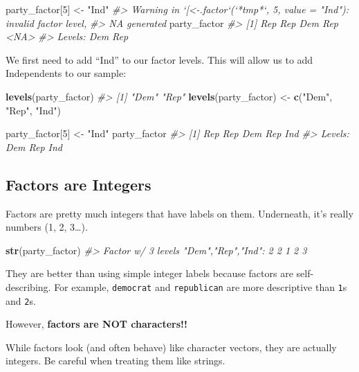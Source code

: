 \documentclass[]{book}
\newenvironment{Shaded}{\begin{snugshade}}{\end{snugshade}}
\newcommand{\KeywordTok}[1]{\textcolor[rgb]{0.13,0.29,0.53}{\textbf{#1}}}
\newcommand{\DecValTok}[1]{\textcolor[rgb]{0.00,0.00,0.81}{#1}}
\newcommand{\StringTok}[1]{\textcolor[rgb]{0.31,0.60,0.02}{#1}}
\newcommand{\CommentTok}[1]{\textcolor[rgb]{0.56,0.35,0.01}{\textit{#1}}}
\newcommand{\NormalTok}[1]{#1}
\begin{document}
\begin{Shaded}
\begin{Highlighting}[]
\NormalTok{party_factor[}\DecValTok{5}\NormalTok{] <-}\StringTok{ "Ind"}
\CommentTok{#> Warning in `[<-.factor`(`*tmp*`, 5, value = "Ind"): invalid factor level,}
\CommentTok{#> NA generated}
\NormalTok{party_factor}
\CommentTok{#> [1] Rep  Rep  Dem  Rep  <NA>}
\CommentTok{#> Levels: Dem Rep}
\end{Highlighting}
\end{Shaded}

We first need to add ``Ind'' to our factor levels. This will allow us to
add Independents to our sample:

\begin{Shaded}
\begin{Highlighting}[]
\KeywordTok{levels}\NormalTok{(party_factor)}
\CommentTok{#> [1] "Dem" "Rep"}
\KeywordTok{levels}\NormalTok{(party_factor) <-}\StringTok{ }\KeywordTok{c}\NormalTok{(}\StringTok{"Dem"}\NormalTok{, }\StringTok{"Rep"}\NormalTok{, }\StringTok{"Ind"}\NormalTok{)}

\NormalTok{party_factor[}\DecValTok{5}\NormalTok{] <-}\StringTok{ "Ind"}
\NormalTok{party_factor}
\CommentTok{#> [1] Rep Rep Dem Rep Ind}
\CommentTok{#> Levels: Dem Rep Ind}
\end{Highlighting}
\end{Shaded}

\subsection{Factors are Integers}\label{factors-are-integers}

Factors are pretty much integers that have labels on them. Underneath,
it's really numbers (1, 2, 3\ldots{}).

\begin{Shaded}
\begin{Highlighting}[]
\KeywordTok{str}\NormalTok{(party_factor)}
\CommentTok{#>  Factor w/ 3 levels "Dem","Rep","Ind": 2 2 1 2 3}
\end{Highlighting}
\end{Shaded}

They are better than using simple integer labels because factors are
self-describing. For example, \texttt{democrat} and \texttt{republican}
are more descriptive than \texttt{1}s and \texttt{2}s.

However, \textbf{factors are NOT characters!!}

While factors look (and often behave) like character vectors, they are
actually integers. Be careful when treating them like strings.
\end{document}
